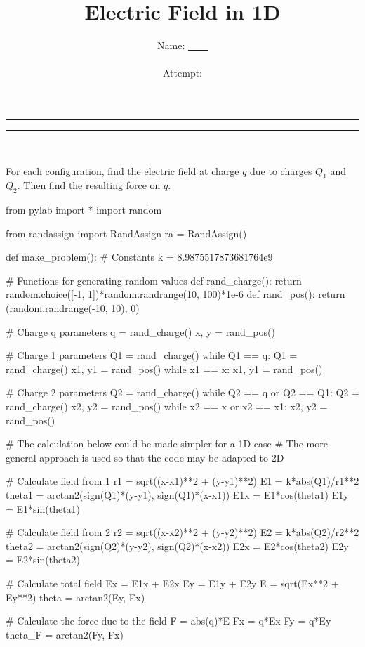 \documentclass[11pt]{article}
\title{Electric Field in 1D}
\author{\Large Name:  \underline{~~~~} \\~\\ Attempt: }
\date{}
\begin{document}
\maketitle

\hrule\vspace{0.02in}\hrule
~\linebreak~\linebreak

\noindent For each configuration, find the electric field at charge $q$ due to charges $Q_1$ and $Q_2$.  Then find the resulting force on $q$.


\begin{pycode}
from pylab import *
import random

from randassign import RandAssign
ra = RandAssign()

def make_problem():
    # Constants
    k =  8.9875517873681764e9
    
    # Functions for generating random values
    def rand_charge():
        return random.choice([-1, 1])*random.randrange(10, 100)*1e-6
    def rand_pos():
        return (random.randrange(-10, 10), 0)
    
    # Charge q parameters
    q = rand_charge()
    x, y = rand_pos()
    
    # Charge 1 parameters
    Q1 = rand_charge()
    while Q1 == q:
        Q1 = rand_charge()
    x1, y1 = rand_pos()
    while x1 == x:
        x1, y1 = rand_pos()
    
    # Charge 2 parameters
    Q2 = rand_charge()
    while Q2 == q or Q2 == Q1:
        Q2 = rand_charge()
    x2, y2 = rand_pos()
    while x2 == x or x2 == x1:
        x2, y2 = rand_pos()
    
    # The calculation below could be made simpler for a 1D case
    # The more general approach is used so that the code may be adapted to 2D
    
    # Calculate field from 1
    r1 = sqrt((x-x1)**2 + (y-y1)**2)
    E1 = k*abs(Q1)/r1**2
    theta1 = arctan2(sign(Q1)*(y-y1), sign(Q1)*(x-x1))
    E1x = E1*cos(theta1)
    E1y = E1*sin(theta1)
    
    # Calculate field from 2
    r2 = sqrt((x-x2)**2 + (y-y2)**2)
    E2 = k*abs(Q2)/r2**2
    theta2 = arctan2(sign(Q2)*(y-y2), sign(Q2)*(x-x2))
    E2x = E2*cos(theta2)
    E2y = E2*sin(theta2)
    
    # Calculate total field
    Ex = E1x + E2x
    Ey = E1y + E2y
    E = sqrt(Ex**2 + Ey**2)
    theta = arctan2(Ey, Ex)
    
    # Calculate the force due to the field
    F = abs(q)*E
    Fx = q*Ex
    Fy = q*Ey
    theta_F = arctan2(Fy, Fx)
    

\end{pycode}
\end{document}
